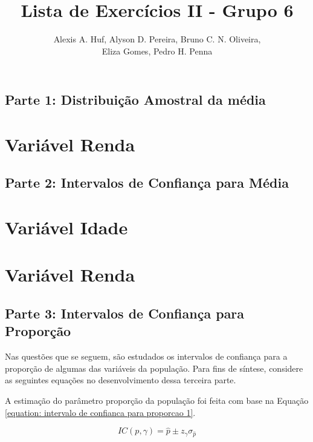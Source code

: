 \documentclass[10pt,a4paper,oneside]{article}
\author{%
	Alexis A. Huf, %
	Alyson D. Pereira, %
	Bruno C. N. Oliveira,\\%
	Eliza Gomes, %
	Pedro H. Penna
	}
\title{Lista de Exercícios II - Grupo 6}
\begin{document}
\maketitle

\begin{center}
	\section*{Parte 1: Distribuição Amostral da média}
\end{center}

\section{Variável Renda}
\label{questao:1}


\begin{center}
	\section*{Parte 2: Intervalos de Confiança para Média}
\end{center}

\section{Variável Idade}
\label{questao:2}


\section{Variável Renda}
\label{questao:3}


\newpage
\begin{center}
	\section*{Parte 3: Intervalos de Confiança para Proporção}
\end{center}

	Nas questões que se seguem, são estudados os intervalos de confiança
	para a proporção de algumas das variáveis da população. Para fins de
	síntese, considere as seguintes equações no desenvolvimento dessa
	terceira parte.
	
	A estimação do parâmetro proporção da população foi feita com base na
	Equação \ref{equation: intervalo de confianca para proporcao 1}.

		\begin{equation}
			IC(p, \gamma) = \hat{p} \pm z_\gamma \sigma_{\hat{p}}
			\label{equation: intervalo de confianca para proporcao 1}
		\end{equation}
	
\end{document}
